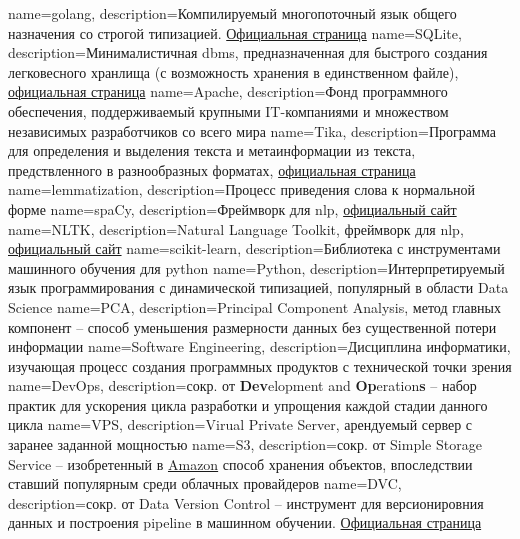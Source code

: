 {
    name=golang,
    description={Компилируемый многопоточный язык общего назначения со строгой типизацией. \href{https://go.dev/}{Официальная страница}}
}
{
    name=SQLite,
    description={Минималистичная \acrshort{dbms}, предназначенная для быстрого создания легковесного хранлища (с возможность хранения в единственном файле), \href{https://www.sqlite.org/index.html}{официальная страница}}
}
{
    name=Apache,
    description={Фонд программного обеспечения, поддерживаемый крупными IT-компаниями и множеством независимых разработчиков со всего мира}
}
{
    name=Tika,
    description={Программа для определения и выделения текста и метаинформации из текста, предствленного в разнообразных форматах, \href{https://tika.apache.org/}{официальная страница}}
}
{
    name=lemmatization,
    description={Процесс приведения слова к нормальной форме}
}
{
    name=spaCy,
    description={Фреймворк для \acrshort{nlp}, \href{https://spacy.io/}{официальный сайт}}
}
{
    name=NLTK,
    description={Natural Language Toolkit, фреймворк для \acrshort{nlp}, \href{https://www.nltk.org/}{официальный сайт}}
}
{
    name=scikit-learn,
    description={Библиотека с инструментами машинного обучения для \gls{python}}
}
{
    name=Python,
    description={Интерпретируемый язык программирования с динамической типизацией, популярный в области Data Science}
}
{
    name=PCA,
    description={Principal Component Analysis, метод главных компонент -- способ уменьшения размерности данных без существенной потери информации}
}
{
    name=Software Engineering,
    description={Дисциплина информатики, изучающая процесс создания программных продуктов с технической точки зрения}
}
{
    name=DevOps,
    description={сокр. от \textbf{Dev}elopment and \textbf{Op}eration\textbf{s} -- набор практик для ускорения цикла разработки и упрощения каждой стадии данного цикла}
}
{
    name=VPS,
    description={Virual Private Server, арендуемый сервер с заранее заданной мощностью}
}
{
    name=S3,
    description={сокр. от Simple Storage Service -- изобретенный в \href{https://aws.amazon.com}{Amazon} способ хранения объектов, впоследствии ставший популярным среди облачных провайдеров}
}
{
    name=DVC,
    description={сокр. от Data Version Control -- инструмент для версионировния данных и построения \gls{pipeline} в машинном обучении. \href{https://dvc.org/}{Официальная страница}}
}
